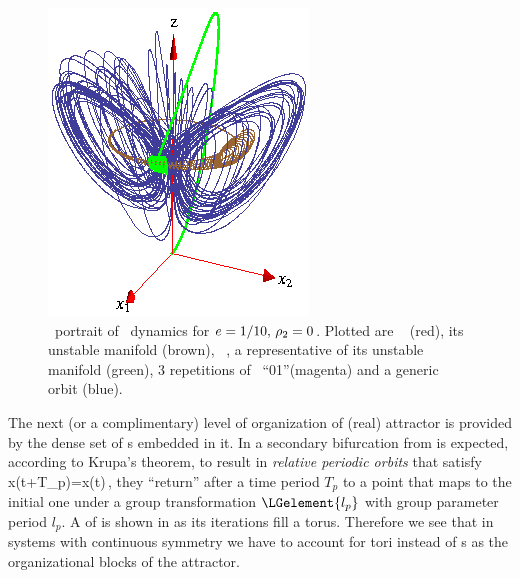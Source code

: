 %
\begin{figure}[ht]
\begin{center}
  \includegraphics[height=0.25\textheight]{../figs/CLE}
\end{center}
\caption[Complex Lorenz flow phase space]
{ \Statesp\ portrait of \CLe\ dynamics for $e=1/10,\,
\rho_2=0$. Plotted are \reqv\  (red), its unstable
manifold (brown), \eqv\ , a representative of its
unstable manifold (green), 3 repetitions of \rpo\
``01''(magenta) and a generic orbit (blue).}
\label{fig:CLE}
\end{figure}
%


The next (or a complimentary) level of organization of (real) {\Le} attractor
is provided by the dense set of \po s embedded in it\rf{DV03,DasBuch}. In {\CLe}
a secondary bifurcation from \REQB{1} is expected, according
to Krupa's theorem, to result in
\emph{relative periodic orbits} that satisfy
\beq
	x(t+T_p)=x(t)\,,
\eeq
{\ie} they ``return'' after a time period $T_p$ to a point that maps to the initial one
under a group transformation $\LGelement{l_p}$ with group parameter period $l_p$.
A {\rpo} of {\CLe} is shown in \reffig{fig:CLE} as its iterations fill a torus. Therefore
we see that in systems with continuous symmetry we have to account for tori instead of {\po s}
as the organizational blocks of the attractor.

\subsection{{\CLe} \reqva}


